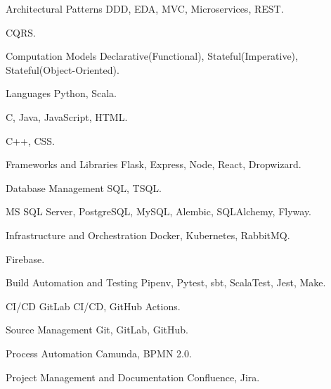   \begin{cvskills}
    \cvskill
      {Architectural Patterns}
      { DDD, EDA, MVC, Microservices, REST.}

    \cvskill
      {}
      { CQRS.}

    \cvskill
      {Computation Models}
      { Declarative(Functional), Stateful(Imperative), Stateful(Object-Oriented).}

    \cvskill
      {Languages}
      { Python, Scala.}

    \cvskill
      {}
      { C, Java, JavaScript, HTML.}

    \cvskill
      {}
      { C++, CSS.}

    \cvskill
      {Frameworks and Libraries}
      { Flask, Express, Node, React, Dropwizard.}

    \cvskill
      {Database Management}
      { SQL, TSQL.}

    \cvskill
      {}
      { MS SQL Server, PostgreSQL, MySQL, Alembic, SQLAlchemy, Flyway.}

    \cvskill
      {Infrastructure and Orchestration}
      { Docker, Kubernetes, RabbitMQ.}

    \cvskill
      {}
      { Firebase.}

    \cvskill
      {Build Automation and Testing}
      { Pipenv, Pytest, sbt, ScalaTest, Jest, Make.}

    \cvskill
      {CI/CD}
      { GitLab CI/CD, GitHub Actions.}

    \cvskill
      {Source Management}
      { Git, GitLab, GitHub.}

    \cvskill
      {Process Automation}
      { Camunda, BPMN 2.0.}

    \cvskill
      {Project Management and Documentation}
      { Confluence, Jira.}
  \end{cvskills}
